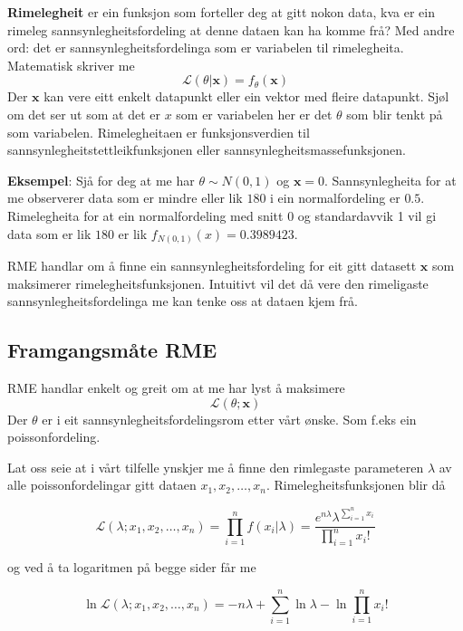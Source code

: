 \textbf{Rimelegheit} er ein funksjon som forteller deg at gitt nokon data, kva er ein rimeleg sannsynlegheitsfordeling at denne dataen kan ha komme frå? Med andre ord: det er sannsynlegheitsfordelinga som er variabelen til rimelegheita. Matematisk skriver me
\begin{equation}
    \mathcal{L}(\theta | \boldsymbol{x}) = f_\theta(\boldsymbol{x})
\end{equation}
Der $\boldsymbol{x}$ kan vere eitt enkelt datapunkt eller ein vektor med fleire datapunkt. Sjøl om det ser ut som at det er $x$ som er variabelen her er det $\theta$ som blir tenkt på som variabelen. Rimelegheitaen er funksjonsverdien til sannsynlegheitstettleikfunksjonen eller sannsynlegheitsmassefunksjonen. 

\textbf{Eksempel}: Sjå for deg at me har $\theta \sim N(0, 1)$ og $\boldsymbol{x} = 0$. Sannsynlegheita for at me observerer data som er mindre eller lik $180$ i ein normalfordeling er $0.5$. Rimelegheita for at ein normalfordeling med snitt 0 og standardavvik 1 vil gi data som er lik $180$ er lik $f_{N(0,1)}(x) = 0.3989423$. 

RME handlar om å finne ein sannsynlegheitsfordeling for eit gitt datasett $\boldsymbol{x}$ som maksimerer rimelegheitsfunksjonen. Intuitivt vil det då vere den rimeligaste sannsynlegheitsfordelinga me kan tenke oss at dataen kjem frå.

\subsection{Framgangsmåte RME}
RME handlar enkelt og greit om at me har lyst å maksimere
\begin{equation}
    \mathcal{L}(\theta ; \boldsymbol{x})
\end{equation}
Der $\theta$ er i eit sannsynlegheitsfordelingsrom etter vårt ønske. Som f.eks ein poissonfordeling. 

Lat oss seie at i vårt tilfelle ynskjer me å finne den rimlegaste parameteren $\lambda$ av alle poissonfordelingar gitt dataen $x_1, x_2, \dots, x_n$. Rimelegheitsfunksjonen blir då

\begin{equation}
    \mathcal{L}(\lambda; x_1, x_2, \dots, x_n) = \prod_{i=1}^n f(x_i | \lambda) = \frac{e^{n\lambda}\lambda^{\sum_{i=1}^n x_i}}{\prod_{i=1}^n x_i!}
\end{equation}

og ved å ta logaritmen på begge sider får me

\begin{equation}
    \ln \mathcal{L}(\lambda; x_1, x_2, \dots, x_n) = -n\lambda + \sum_{i=1}^n \ln \lambda - \ln \prod_{i=1}^n x_i!
\end{equation}

